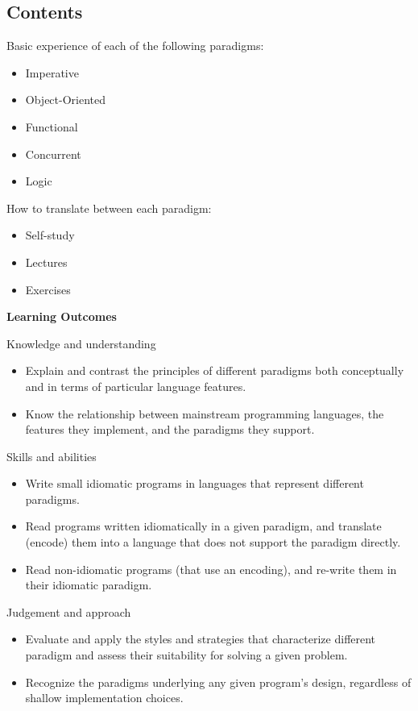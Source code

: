 \documentclass[utf8x,compress,hyperref]{beamer}
\begin{document}
\subsection{Contents}
\begin{frame}
Basic experience of each of the following paradigms:
  \begin{itemize}
  \item Imperative 
  \item Object-Oriented
  \item Functional
  \item Concurrent
  \item Logic
  \end{itemize}

 How to translate between each paradigm:

\pause 

\begin{itemize}
\item Self-study
\item Lectures
\item Exercises
\end{itemize}

\end{frame}


\begin{frame}

\textbf{Learning Outcomes}

\scriptsize
Knowledge and understanding
\begin{itemize}
\item Explain and contrast the principles of different paradigms both
conceptually and in terms of particular language features.
\item Know the relationship between mainstream programming languages, the
features they implement, and the paradigms they support.
\end{itemize}


Skills and abilities

\begin{itemize}
\item Write small idiomatic programs in languages that represent
  different paradigms.

\item Read programs written idiomatically in a given paradigm, and
  translate (encode) them into a language that does not support the
  paradigm directly.

\item Read non-idiomatic programs (that use an encoding), and re-write
  them in their idiomatic paradigm.
\end{itemize}


Judgement and approach
\begin{itemize}
\item 
  Evaluate and apply the styles and strategies that characterize
  different paradigm and assess their suitability for solving a given
  problem.

\item 
  Recognize the paradigms underlying any given program's design,
  regardless of shallow implementation choices.
\end{itemize}
\end{frame}
\end{document}
